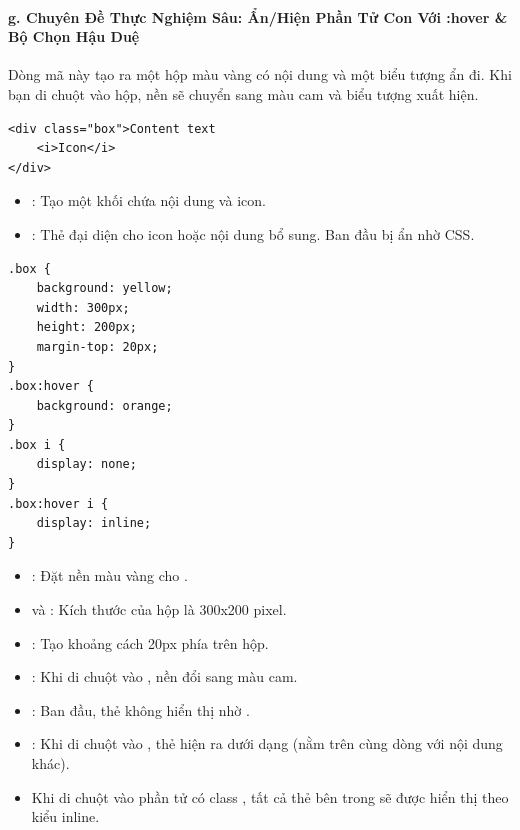 \paragraph{g. Chuyên Đề Thực Nghiệm Sâu: Ẩn/Hiện Phần Tử Con Với :hover \& Bộ Chọn Hậu Duệ}

Dòng mã này tạo ra một hộp màu vàng có nội dung và một biểu tượng ẩn đi. Khi bạn di chuột vào hộp, nền sẽ chuyển sang màu cam và biểu tượng xuất hiện.

\begin{codeWindow}
\begin{lstlisting}[language=HTML5]
<div class="box">Content text
    <i>Icon</i>
</div>
\end{lstlisting}
\end{codeWindow}
\begin{itemize}[leftmargin=1.5em, itemsep=2pt, parsep=0pt]
    \item {}: Tạo một khối chứa nội dung và icon.
    \item {}: Thẻ  đại diện cho icon hoặc nội dung bổ sung. Ban đầu bị ẩn nhờ CSS.
\end{itemize}

\begin{codeWindow}
\begin{lstlisting}[language=CSS3]
.box {
    background: yellow;
    width: 300px;
    height: 200px;
    margin-top: 20px;
}
.box:hover {
    background: orange;
}
.box i {
    display: none;
}
.box:hover i {
    display: inline;
}
\end{lstlisting}
\end{codeWindow}

\begin{conceptBox}
\begin{itemize}[leftmargin=1.5em, itemsep=3pt, parsep=0pt]
    \item {}: Đặt nền màu vàng cho .
    \item {} và : Kích thước của hộp là 300x200 pixel.
    \item {}: Tạo khoảng cách 20px phía trên hộp.
    \item {}: Khi di chuột vào , nền đổi sang màu cam.
    \item {}: Ban đầu, thẻ  không hiển thị nhờ .
    \item {}: Khi di chuột vào , thẻ  hiện ra dưới dạng  (nằm trên cùng dòng với nội dung khác).
    \item Khi di chuột vào phần tử có class , tất cả thẻ  bên trong sẽ được hiển thị theo kiểu inline.
\end{itemize}
\end{conceptBox}

